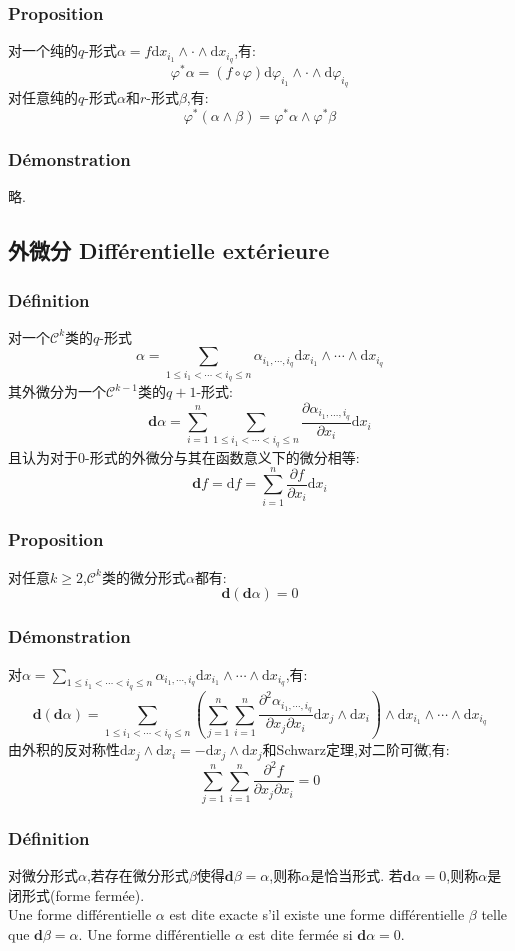 \documentclass[12pt, a4paper, oneside]{ctexbook}
\newcommand{\di }{\text{d}}%
\newcommand{\pian }{\partial}%
\newcommand{\die }{\textbf{d}}%
\newcommand{\fai }{\varphi}%
\newcommand{\C }{\mathcal{C}}%
\begin{document}
  \subsubsection{Proposition}
  对一个纯的$q$-形式$\alpha=f\di x_{i_1}\wedge\cdot\wedge\di x_{i_q}$,有:
  $$
  \fai^*\alpha=(f\circ\fai)\di\fai_{i_1}\wedge\cdot\wedge\di\fai_{i_q}
  $$
  对任意纯的$q$-形式$\alpha$和$r$-形式$\beta$,有:
  $$
  \fai^*(\alpha\wedge\beta)=\fai^*\alpha\wedge\fai^*\beta
  $$
  \subsubsection{Démonstration}
  略.
  \subsection{外微分 Différentielle extérieure}
  \subsubsection{Définition}
  对一个$\C^k$类的$q$-形式
  $$
  \alpha=\sum_{1\leq i_1<\cdots<i_q\leq n}\alpha_{i_1,\cdots,i_q}\di x_{i_1}\wedge\cdots\wedge\di x_{i_q}
  $$
  其外微分为一个$\C^{k-1}$类的$q+1$-形式:
  $$
  \die \alpha=\sum_{i=1}^{n}\sum_{1\leq i_1<\cdots<i_q\leq n}\frac{\pian \alpha_{i_1,\dots,i_q}}{\pian x_i}\di x_i
  $$
  且认为对于0-形式的外微分与其在函数意义下的微分相等:
  $$
  \die f=\di f=\sum_{i=1}^{n}\frac{\pian f}{\pian x_i}\di x_i
  $$
  \subsubsection{Proposition}\label{myref:exact_est_ferme}
  对任意$k\geq 2$,$\C^k$类的微分形式$\alpha$都有:
  $$
  \die(\die\alpha)=0
  $$
  \subsubsection{Démonstration}
  对$ \alpha=\sum_{1\leq i_1<\cdots<i_q\leq n}\alpha_{i_1,\cdots,i_q}\di x_{i_1}\wedge\cdots\wedge\di x_{i_q}$,有:
  $$
    \die(\die\alpha)=\sum_{1\leq i_1<\cdots<i_q\leq n}( \sum_{j=1}^{n}\sum_{i=1}^{n}\frac{\pian^2\alpha_{i_1,\cdots,i_q}}{\pian x_j\pian x_i}\di x_j\wedge\di x_i )\wedge\di x_{i_1}\wedge\cdots\wedge\di x_{i_q}
  $$
  由外积的反对称性$\di x_j\wedge\di x_i=-\di x_j\wedge\di x_j$和Schwarz定理,对二阶可微\f,有:
  $$
  \sum_{j=1}^{n}\sum_{i=1}^{n}\frac{\pian^2f}{\pian x_j\pian x_i}=0
  $$
  \subsubsection{Définition}
  对微分形式$\alpha$,若存在微分形式$\beta$使得$\die\beta=\alpha$,则称$\alpha$是恰当形式.
  若$\die \alpha=0$,则称$\alpha$是闭形式(forme fermée).\\
  \indent
  Une forme différentielle $\alpha$ est dite exacte s'il existe une forme différentielle $\beta$ telle que $\die \beta=\alpha$.
  Une forme différentielle $\alpha$ est dite fermée si $\die \alpha=0$.
\end{document}
